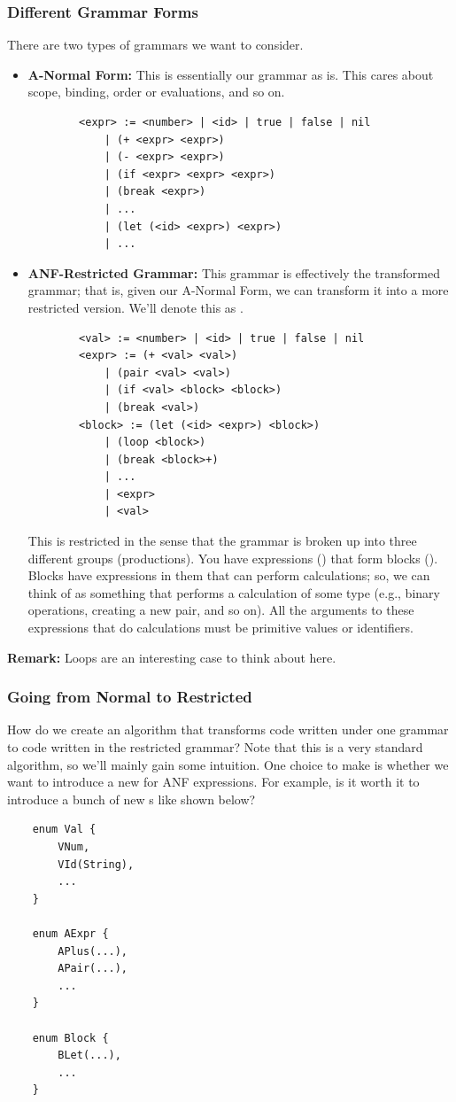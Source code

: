 \subsubsection{Different Grammar Forms}
There are two types of grammars we want to consider. 
\begin{itemize}
    \item \textbf{A-Normal Form:} This is essentially our grammar as is. This cares about scope, binding, order or evaluations, and so on. 
    
    \begin{verbatim}
        <expr> := <number> | <id> | true | false | nil 
            | (+ <expr> <expr>)
            | (- <expr> <expr>)
            | (if <expr> <expr> <expr>)
            | (break <expr>)
            | ... 
            | (let (<id> <expr>) <expr>)
            | ... \end{verbatim}
    \item \textbf{ANF-Restricted Grammar:} This grammar is effectively the transformed grammar; that is, given our A-Normal Form, we can transform it into a more restricted version. We'll denote this as .
    \begin{verbatim}
        <val> := <number> | <id> | true | false | nil 
        <expr> := (+ <val> <val>) 
            | (pair <val> <val>) 
            | (if <val> <block> <block>)
            | (break <val>)
        <block> := (let (<id> <expr>) <block>)
            | (loop <block>)
            | (break <block>+)
            | ... 
            | <expr>
            | <val>\end{verbatim}
        This is restricted in the sense that the grammar is broken up into three different groups (productions). You have expressions () that form blocks (). Blocks have expressions in them that can perform calculations; so, we can think of  as something that performs a calculation of some type (e.g., binary operations, creating a new pair, and so on). All the arguments to these expressions that do calculations must be primitive values or identifiers.  
\end{itemize}
\textbf{Remark:} Loops are an interesting case to think about here. 

\subsubsection{Going from Normal to Restricted}
How do we create an algorithm that transforms code written under one grammar to code written in the restricted grammar? Note that this is a very standard algorithm, so we'll mainly gain some intuition. One choice to make is whether we want to introduce a new  for ANF expressions. For example, is it worth it to introduce a bunch of new s like shown below?
\begin{verbatim}
    enum Val {
        VNum,
        VId(String),
        ...
    }

    enum AExpr {
        APlus(...),
        APair(...),
        ... 
    }

    enum Block {
        BLet(...),
        ...
    }\end{verbatim}

